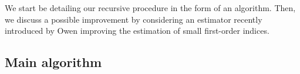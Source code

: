 \documentclass[]{elsarticle}
\makeatletter
\theoremstyle{definition}
\newcommand{\bvec}[1]{\boldsymbol{#1}}
\newcommand{\vx}{\bvec{x}}
\newcommand*{\ov}[1]{
  \m@th\overline{\mbox{#1}\raisebox{2mm}{}}
}
\makeatother
\begin{document}
We start be detailing our recursive procedure in the form of an algorithm. Then, we discuss a possible improvement by considering an estimator recently introduced by Owen improving the estimation of small first-order indices.

\subsection{Main algorithm}
%
%
%
%
\end{document}
